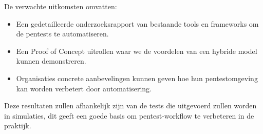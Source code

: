 De verwachte uitkomsten omvatten:
\begin{itemize}
    \item Een gedetailleerde onderzoeksrapport van bestaande tools en frameworks om de pentests te automatiseren.
    \item Een Proof of Concept uitrollen waar we de voordelen van een hybride model kunnen demonstreren.
    \item Organisaties concrete aanbevelingen kunnen geven hoe hun pentestomgeving kan worden verbetert door automatisering.
\end{itemize}

Deze resultaten zullen afhankelijk zijn van de tests die uitgevoerd zullen worden in simulaties, dit geeft een goede basis om 
pentest-workflow te verbeteren in de praktijk.